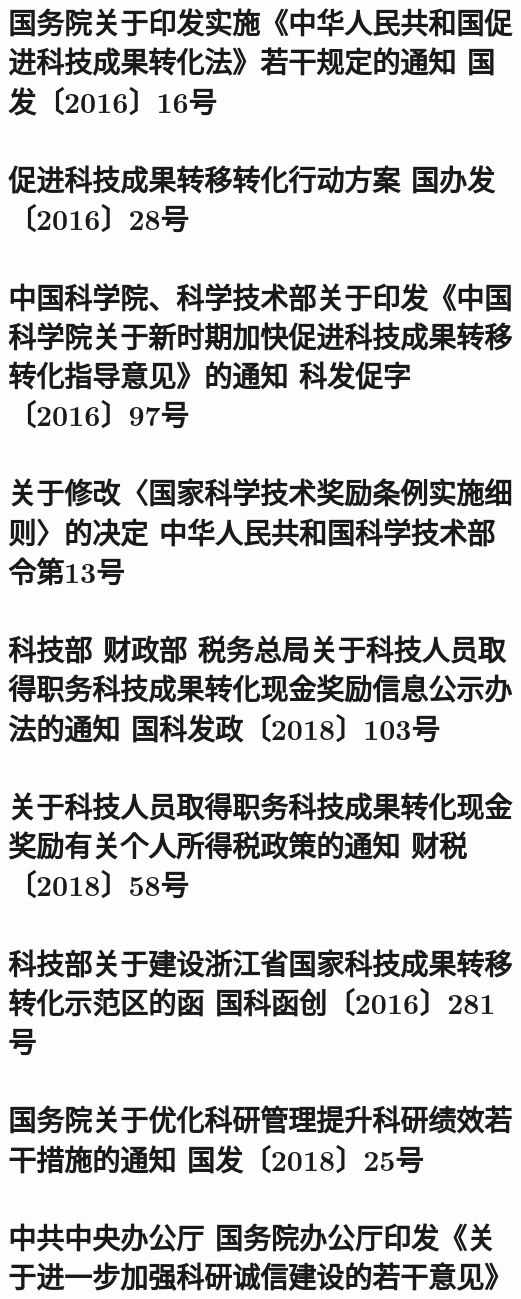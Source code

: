 \documentclass[openany]{book}
\begin{document}
\section{国务院关于印发实施《中华人民共和国促进科技成果转化法》若干规定的通知 国发〔2016〕16号}


\section{促进科技成果转移转化行动方案 国办发〔2016〕28号}


\section{中国科学院、科学技术部关于印发《中国科学院关于新时期加快促进科技成果转移转化指导意见》的通知 科发促字〔2016〕97号}


\section{关于修改〈国家科学技术奖励条例实施细则〉的决定 中华人民共和国科学技术部令第13号}


\section{科技部 财政部 税务总局关于科技人员取得职务科技成果转化现金奖励信息公示办法的通知 国科发政〔2018〕103号}


\section{关于科技人员取得职务科技成果转化现金奖励有关个人所得税政策的通知 财税〔2018〕58号}


\section{科技部关于建设浙江省国家科技成果转移转化示范区的函 国科函创〔2016〕281号}


\section{国务院关于优化科研管理提升科研绩效若干措施的通知 国发〔2018〕25号}


\section{中共中央办公厅 国务院办公厅印发《关于进一步加强科研诚信建设的若干意见》}

\end{document}
